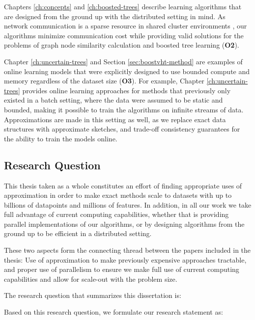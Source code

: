 Chapters \ref{ch:concepts} and \ref{ch:boosted-trees} describe learning algorithms that
are designed from the ground up with the distributed setting in mind. As network
communication is a sparse resource in shared cluster environments \cite{optimization-communication-complexity},
our algorithms minimize communication cost while providing valid
solutions for the problems of graph node similarity calculation and
boosted tree learning (\textbf{O2}).

Chapter \ref{ch:uncertain-trees} and Section \ref{sec:boostvht-method}
are examples of online learning models
that were explicitly designed to use bounded compute and memory regardless of the
dataset size (\textbf{O3}). For example, Chapter \ref{ch:uncertain-trees} provides online learning approaches
for methods that previously only existed in a batch setting, where the data were assumed to be
static and bounded, making it possible to train the algorithms on infinite streams of
data. Approximations are made in this setting as well,
as we replace exact data structures with approximate sketches, and trade-off consistency
guarantees for the ability to train the models online.


\subsection{Research Question}

This thesis taken as a whole constitutes an effort of finding appropriate
uses of approximation in order to make exact methods scale to datasets
with up to billions of datapoints and millions of features.
In addition, in all our work we take full advantage of current computing
capabilities,
whether that is providing parallel implementations of our algorithms,
or by designing algorithms from the
ground up to be efficient in a distributed setting.

These two aspects form the connecting thread between the papers
included in the thesis: Use of approximation to make previously expensive approaches tractable, and
proper use of parallelism to ensure we make full use of current
computing capabilities and allow for scale-out with the problem size.

The research question that summarizes this dissertation is:

\begin{displayquote}
	\researchQuestion
\end{displayquote}

\noindent
Based on this research question, we formulate our research statement as:

